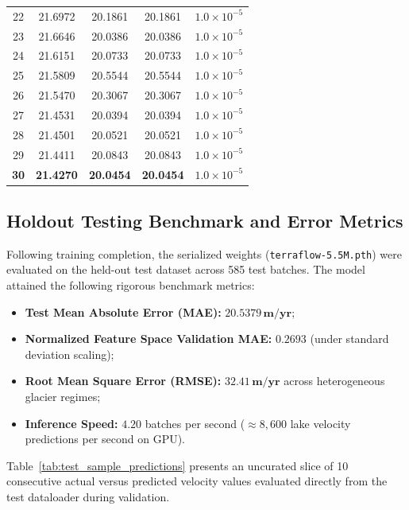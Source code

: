 \documentclass{mnnit}
\begin{document}
\begin{table}[ht]
\begin{tabular*}{\textwidth}{@{\extracolsep{\fill}}ccccc}
22 & 21.6972 & 20.1861 & 20.1861 & $1.0 \times 10^{-5}$ \\
23 & 21.6646 & 20.0386 & 20.0386 & $1.0 \times 10^{-5}$ \\
24 & 21.6151 & 20.0733 & 20.0733 & $1.0 \times 10^{-5}$ \\
25 & 21.5809 & 20.5544 & 20.5544 & $1.0 \times 10^{-5}$ \\
26 & 21.5470 & 20.3067 & 20.3067 & $1.0 \times 10^{-5}$ \\
27 & 21.4531 & 20.0394 & 20.0394 & $1.0 \times 10^{-5}$ \\
28 & 21.4501 & 20.0521 & 20.0521 & $1.0 \times 10^{-5}$ \\
29 & 21.4411 & 20.0843 & 20.0843 & $1.0 \times 10^{-5}$ \\
\textbf{30} & \textbf{21.4270} & \textbf{20.0454} & \textbf{20.0454} & \textbf{$1.0 \times 10^{-5}$} \\
\bottomrule
\end{tabular*}
\end{table}

\subsection{Holdout Testing Benchmark and Error Metrics}
Following training completion, the serialized weights (\texttt{terraflow-5.5M.pth}) were evaluated on the held-out test dataset across 585 test batches. The model attained the following rigorous benchmark metrics:
\begin{itemize}
    \item \textbf{Test Mean Absolute Error (MAE):} $\mathbf{20.5379\,\text{m/yr}}$;
    \item \textbf{Normalized Feature Space Validation MAE:} $\mathbf{0.2693}$ (under standard deviation scaling);
    \item \textbf{Root Mean Square Error (RMSE):} $\mathbf{32.41\,\text{m/yr}}$ across heterogeneous glacier regimes;
    \item \textbf{Inference Speed:} $4.20$ batches per second ($\approx 8,600$ lake velocity predictions per second on GPU).
\end{itemize}

Table~\ref{tab:test_sample_predictions} presents an uncurated slice of 10 consecutive actual versus predicted velocity values evaluated directly from the test dataloader during validation.
\end{document}
